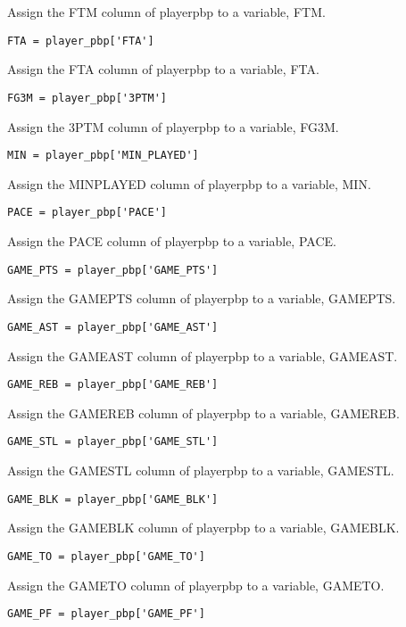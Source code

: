 \documentclass{article}
\begin{document}
Assign the FTM column of player\textunderscore pbp to a variable, FTM.
\begin{lstlisting}
FTA = player_pbp['FTA']
\end{lstlisting}
Assign the FTA column of player\textunderscore pbp to a variable, FTA.
\begin{lstlisting}
FG3M = player_pbp['3PTM']
\end{lstlisting}
Assign the 3PTM column of player\textunderscore pbp to a variable, FG3M.
\begin{lstlisting}
MIN = player_pbp['MIN_PLAYED']
\end{lstlisting}
Assign the MIN\textunderscore PLAYED column of player\textunderscore pbp to a variable, MIN.
\begin{lstlisting}
PACE = player_pbp['PACE']
\end{lstlisting}
Assign the PACE column of player\textunderscore pbp to a variable, PACE.
\begin{lstlisting}
GAME_PTS = player_pbp['GAME_PTS']
\end{lstlisting}
Assign the GAME\textunderscore PTS column of player\textunderscore pbp to a variable, GAME\textunderscore PTS.
\begin{lstlisting}
GAME_AST = player_pbp['GAME_AST']
\end{lstlisting}
Assign the GAME\textunderscore AST column of player\textunderscore pbp to a variable, GAME\textunderscore AST.
\begin{lstlisting}
GAME_REB = player_pbp['GAME_REB']
\end{lstlisting}
Assign the GAME\textunderscore REB column of player\textunderscore pbp to a variable, GAME\textunderscore REB.
\begin{lstlisting}
GAME_STL = player_pbp['GAME_STL']
\end{lstlisting}
Assign the GAME\textunderscore STL column of player\textunderscore pbp to a variable, GAME\textunderscore STL.
\begin{lstlisting}
GAME_BLK = player_pbp['GAME_BLK']
\end{lstlisting}
Assign the GAME\textunderscore BLK column of player\textunderscore pbp to a variable, GAME\textunderscore BLK.
\begin{lstlisting}
GAME_TO = player_pbp['GAME_TO']
\end{lstlisting}
Assign the GAME\textunderscore TO column of player\textunderscore pbp to a variable, GAME\textunderscore TO.
\begin{lstlisting}
GAME_PF = player_pbp['GAME_PF']
\end{lstlisting}
\end{document}
